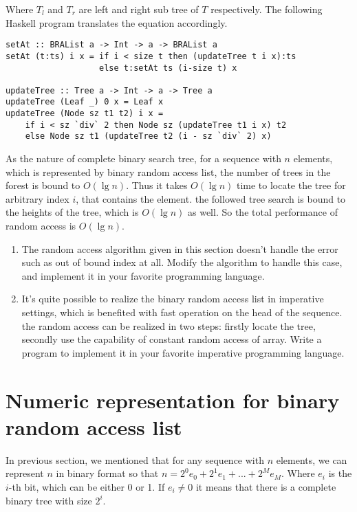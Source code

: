 \documentclass[UTF8]{article}
\begin{document}
Where $T_l$ and $T_r$ are left and right sub tree of $T$ respectively. The following
Haskell program translates the equation accordingly.

\begin{lstlisting}
setAt :: BRAList a -> Int -> a -> BRAList a
setAt (t:ts) i x = if i < size t then (updateTree t i x):ts
                   else t:setAt ts (i-size t) x

updateTree :: Tree a -> Int -> a -> Tree a
updateTree (Leaf _) 0 x = Leaf x
updateTree (Node sz t1 t2) i x =
    if i < sz `div` 2 then Node sz (updateTree t1 i x) t2
    else Node sz t1 (updateTree t2 (i - sz `div` 2) x)
\end{lstlisting}

As the nature of complete binary search tree, for a sequence with $n$ elements, which
is represented by binary random
access list, the number of trees in the forest is bound to $O(\lg n)$. Thus it takes
$O(\lg n)$ time to locate the tree for arbitrary index $i$, that contains the element.
the followed tree search is bound to the heights of the tree, which is $O(\lg n)$ as well.
So the total performance of random access is $O(\lg n)$.

\begin{Exercise}
\begin{enumerate}
\item The random access algorithm given in this section doesn't handle the error such as
out of bound index at all. Modify the algorithm to handle this case, and implement
it in your favorite programming language.

\item It's quite possible to realize the binary random access list in imperative settings,
which is benefited with fast operation on the head of the sequence. the random access
can be realized in two steps: firstly locate the tree, secondly use the capability of
constant random access of array. Write a program to implement it in your favorite imperative
programming language.
\end{enumerate}
\end{Exercise}

\section{Numeric representation for binary random access list}
In previous section, we mentioned that for any sequence with $n$ elements, we can
represent $n$ in binary format so that $n = 2^0e_0 + 2^1e_1 + ... + 2^Me_M$. Where $e_i$
is the $i$-th bit, which can be either 0 or 1. If $e_i \neq 0$ it means that there is
a complete binary tree with size $2^i$.
\end{document}
